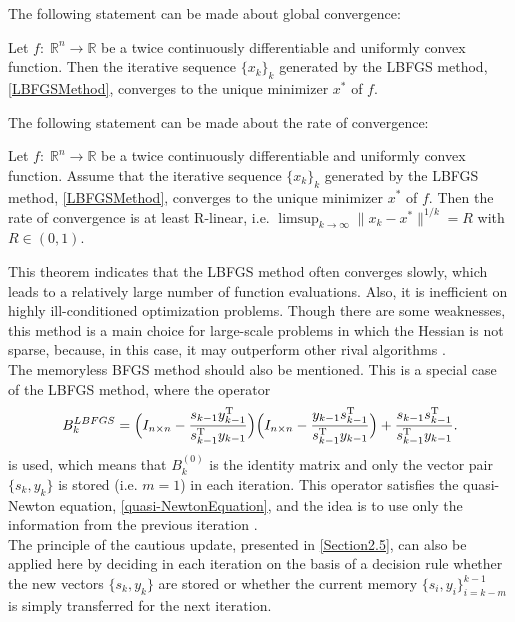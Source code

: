 The following statement can be made about global convergence: 

\begin{theorem}
    Let $f \colon \; \mathbb{R}^n \to \mathbb{R}$ be a twice continuously differentiable and uniformly convex function. Then the iterative sequence $\{x_k\}_k$ generated by the LBFGS method, \cref{LBFGSMethod}, converges to the unique minimizer $x^*$ of $f$. 
\end{theorem}

The following statement can be made about the rate of convergence:

\begin{theorem}
    Let $f \colon \; \mathbb{R}^n \to \mathbb{R}$ be a twice continuously differentiable and uniformly convex function. Assume that the iterative sequence $\{x_k\}_k$ generated by the LBFGS method, \cref{LBFGSMethod}, converges to the unique minimizer $x^*$ of $f$. Then the rate of convergence is at least R-linear, i.e. $\limsup_{k \rightarrow \infty} \lVert x_k - x^* \rVert^{1/k} = R$ with $R \in (0,1)$.
\end{theorem}

This theorem indicates that the LBFGS method often converges slowly, which leads to a relatively large number of function evaluations. Also, it is inefficient on highly ill-conditioned optimization problems. Though there are some weaknesses, this method is a main choice for large-scale problems in which the Hessian is not sparse, because, in this case, it may outperform other rival algorithms \cite[p.~300]{SunYuan:2006}. \\
The memoryless BFGS method should also be mentioned. This is a special case of the LBFGS method, where the operator 
\begin{equation*}
    B^{LBFGS}_k = \Big{(} I_{n \times n} - \frac{s_{k-1} y^{\mathrm{T}}_{k-1}}{s_{k-1}^{\mathrm{T}} y_{k-1}} \Big{)} \Big{(} I_{n \times n} - \frac{y_{k-1} s^{\mathrm{T}}_{k-1}}{s_{k-1}^{\mathrm{T}} y_{k-1}} \Big{)} + \frac{s_{k-1} s^{\mathrm{T}}_{k-1}}{s_{k-1}^{\mathrm{T}} y_{k-1}}.
\end{equation*}
is used, which means that $B^{(0)}_k$ is the identity matrix and only the vector pair $\{s_k, y_k\}$ is stored (i.e. $m=1$) in each iteration. This operator satisfies the quasi-Newton equation, \cref{quasi-NewtonEquation}, and the idea is to use only the information from the previous iteration \cite[p.~301]{SunYuan:2006}. \\
The principle of the cautious update, presented in \cref{Section2.5}, can also be applied here by deciding in each iteration on the basis of a decision rule whether the new vectors $\{s_k, y_k\}$ are stored or whether the current memory $\{ s_i, y_i\}_{i=k-m}^{k-1}$ is simply transferred for the next iteration. \\